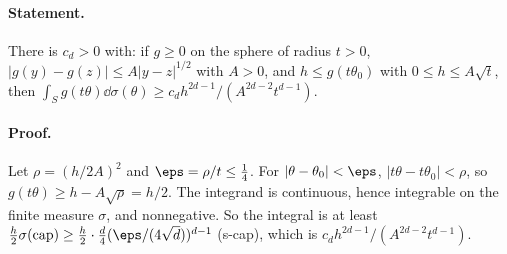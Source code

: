 \paragraph{Statement.} There is $c_d>0$ with: if $g\geq0$ on the sphere of radius $t>0$, $|g(y)-g(z)|\leq A|y-z|^{1/2}$ with $A>0$, and
$h\leq g(t\theta_0)$ with $0\leq h\leq A\sqrt t$, then $\int_Sg(t\theta)\dd\sigma(\theta)\geq c_dh^{2d-1}/(A^{2d-2}t^{d-1})$.
\paragraph{Proof.} Let $\rho=(h/2A)^2$ and $\eps=\rho/t\leq\frac14$. For $|\theta-\theta_0|<\eps$, $|t\theta-t\theta_0|<\rho$, so $g(t\theta)\geq h-A\sqrt\rho=h/2$. The
integrand is continuous, hence integrable on the finite measure $\sigma$, and nonnegative. So the integral is at least
$\frac h2\sigma(\mathrm{cap})\geq\frac h2\cdot\frac d4(\eps/(4\sqrt d))^{d-1}$ (s-cap), which is $c_dh^{2d-1}/(A^{2d-2}t^{d-1})$.

